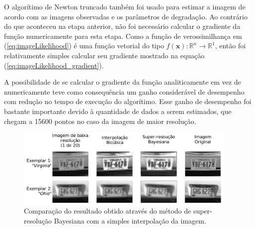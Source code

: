 O algorítimo de Newton truncado também foi usado para estimar a imagem de acordo com as imagens observadas e os parâmetros de degradação.
Ao contrário do que aconteceu na etapa anterior, não foi necessário calcular o gradiente da função numericamente para esta etapa.
Como a função de verossimilhança em (\ref{eq:imageLikelihood}) é uma função vetorial do tipo $ f(\mathbf{x}) : \mathbb{R}^n \to \mathbb{R}^1$, então foi relativamente simples calcular seu gradiente mostrado na equação (\ref{eq:imageLikelihood_gradient}).

A possibilidade de se calcular o gradiente da função analiticamente em vez de numericamente teve como consequência um ganho considerável de desempenho com redução no tempo de execução do algorítimo.
Esse ganho de desempenho foi bastante importante devido à quantidade de dados a serem estimados, que chegam a 15600 pontos no caso da imagem de maior resolução.



\begin{figure}[H]
	\centering
	\caption{Comparação do resultado obtido através do método de super-resolução Bayesiana com a simples interpolação da imagem.}
	\includegraphics[width = 0.95\textwidth]{./figures/results_figures/result_compare.pdf}
\end{figure}
